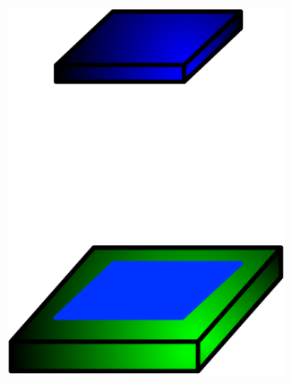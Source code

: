 \documentclass[10pt,fleqn]{article} %
\begin{document}
\begin{figure}[h]
  \begin{subfigure}[b]{0.3\textwidth}
    \centering
    \includegraphics[width=0.9\textwidth,height=.2\textheight,keepaspectratio]{images/plan-plan}
    \caption{}
  \end{subfigure}\hfill
  \begin{subfigure}[b]{0.3\textwidth}
    \centering

\end{subfigure}
\end{figure}
\end{document}
